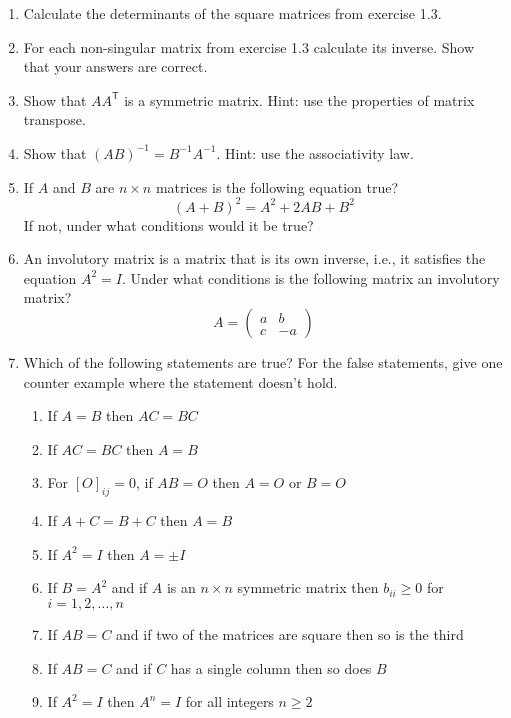 \documentclass[a4paper,11pt]{article}
\begin{document}
\begin{enumerate}[label=1.\arabic*]
    \item Calculate the determinants of the square matrices from exercise 1.3.
    
    \item For each non-singular matrix from exercise 1.3 calculate its inverse. Show that your answers are correct.
    \item Show that $AA^\mathsf{T}$ is a symmetric matrix. Hint: use the properties of matrix transpose.
    
    \item Show that $(AB)^{-1} = B^{-1}A^{-1}$. Hint: use the associativity law. 
    
    \item If $A$ and $B$ are $n \times n$ matrices is the following equation true?
    $$(A + B)^2 = A^2 + 2AB + B^2$$
    If not, under what conditions would it be true?

    \item An involutory matrix is a matrix that is its own inverse, i.e., it satisfies the equation $A^2 = I$. Under what conditions is the following matrix an involutory matrix?
    $$A = \begin{pmatrix} a & b \\ c & -a \end{pmatrix} $$

    \item Which of the following statements are true? For the false statements, give one counter example where the statement doesn't hold.
    \begin{enumerate}
        \item If $A = B$ then $AC = BC$
        \item If $AC = BC$ then $A = B$
        \item For $[O]_{ij} = 0$, if $AB = O$ then $A = O$ or $B = O$
        \item If $A + C = B + C$ then $A = B$
        \item If $A^2 = I$ then $A = \pm I$
        \item If $B = A^2$ and if $A$ is an $n \times n$ symmetric matrix then $b_{ii} \geq 0$ for $i = 1, 2, \ldots, n$
        \item If $AB = C$ and if two of the matrices are square then so is the third
        \item If $AB = C$ and if $C$ has a single column then so does $B$
        \item If $A^2 = I$ then $A^n = I$ for all integers $n \geq 2$
    \end{enumerate}


\end{enumerate}
\end{document}
